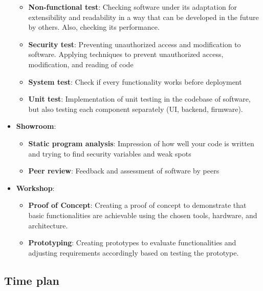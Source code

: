 \documentclass[a4paper, 11pt]{article}
\begin{document}
\begin{itemize}
\begin{itemize}
    \item \textbf{Non-functional test}: Checking software under its adaptation for extensibility and readability in a way that can be developed in the future by others. Also, checking its performance.
    \item \textbf{Security test}: Preventing unauthorized access and modification to software. Applying techniques to prevent unauthorized access, modification, and reading of code
    \item \textbf{System test}: Check if every functionality works before deployment
    \item  \textbf{Unit test}: Implementation of unit testing in the codebase of software, but also testing each component separately (UI, backend, firmware).
  \end{itemize}
  \item \textbf{Showroom}: 
  \begin{itemize}
    \item \textbf{Static program analysis}:  Impression of how well your code is written and trying to find security variables and weak spots 
    \item\textbf{Peer review}: Feedback and assessment of software by peers
  \end{itemize}
  \item \textbf{Workshop}: 
  \begin{itemize}
    \item \textbf{Proof of Concept}: Creating a proof of concept to demonstrate that basic functionalities are achievable using the chosen tools, hardware, and architecture.
    \item\textbf{Prototyping}: Creating prototypes to evaluate functionalities and adjusting requirements accordingly based on testing the prototype.
  \end{itemize}
\end{itemize}
\pagebreak


\subsection{Time plan}
\end{document}
